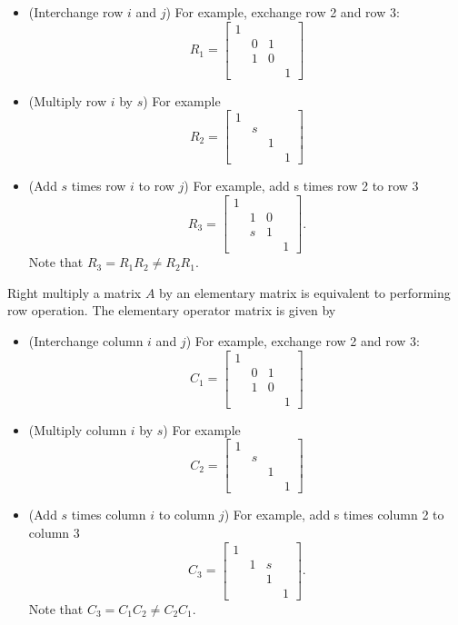 \begin{refsection}
\begin{lemma}
\begin{itemize}
	\item (Interchange row $i$ and $j$) For example, exchange  row 2 and row 3:
	$$R_1=\begin{bmatrix}
	1 &  &  & \\ 
	& 0 & 1 & \\ 
	& 1 & 0 & \\ 
	&  &  & 1
	\end{bmatrix}$$
	\item (Multiply row $i$ by $s$) For example
		$$R_2=\begin{bmatrix}
	1 &  &  & \\ 
	& s &  & \\ 
	&  & 1 & \\ 
	&  &  & 1
	\end{bmatrix}$$
	\item (Add $s$ times row $i$ to row $j$) For example, add s times row 2 to row 3
	$$R_3=\begin{bmatrix}
	1 &  &  & \\ 
	& 1 & 0 & \\ 
	& s & 1 & \\ 
	&  &  & 1
	\end{bmatrix}.$$
	Note that $R_3 = R_1R_2 \neq R_2R_1.$
\end{itemize}	
\end{lemma}


\begin{lemma} Right multiply a matrix $A$ by an elementary matrix is equivalent to performing row operation. The elementary operator matrix is given by	
	\begin{itemize}
		\item (Interchange column $i$ and $j$) For example, exchange  row 2 and row 3:
		$$C_1=\begin{bmatrix}
		1 &  &  & \\ 
		& 0 & 1 & \\ 
		& 1 & 0 & \\ 
		&  &  & 1
		\end{bmatrix}$$
		\item (Multiply column $i$ by $s$) For example
		$$C_2=\begin{bmatrix}
		1 &  &  & \\ 
		& s &  & \\ 
		&  & 1 & \\ 
		&  &  & 1
		\end{bmatrix}$$
		\item (Add $s$ times column $i$ to column $j$) For example, add s times column 2 to column 3
		$$C_3=\begin{bmatrix}
		1 &  &  & \\ 
		& 1 & s & \\ 
		&  & 1 & \\ 
		&  &  & 1
		\end{bmatrix}.$$
		Note that $C_3 = C_1C_2 \neq C_2C_1.$
	\end{itemize}	
\end{lemma}




\end{refsection}
